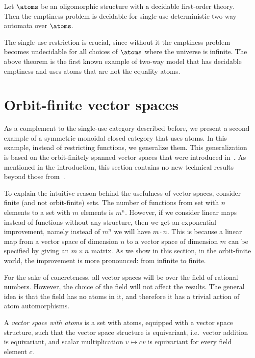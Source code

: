 \begin{theorem}\label{thm:two-way-automata}
    Let $\atoms$ be an oligomorphic structure with a decidable first-order theory. Then the emptiness problem is decidable for single-use deterministic  two-way automata over $\atoms$.
\end{theorem}

The single-use restriction is crucial, since without it the emptiness problem becomes undecidable for all choices of $\atoms$ where the universe is infinite. The above theorem is the first known example of two-way model that has decidable emptiness and uses atoms that are not the equality atoms. 

\section{Orbit-finite vector spaces}
As a complement to the single-use category described before, we present a second example of a symmetric monoidal closed category that  uses atoms. In this example, instead of restricting functions, we generalize them. This generalization is based on the  orbit-finitely spanned vector spaces that were introduced in~\cite{bojanczykKM21OrbitFiniteVector}. As mentioned in the introduction,  this section contains no new technical results beyond those from~\cite{bojanczykKM21OrbitFiniteVector}. 

To explain the intuitive reason behind the usefulness of vector spaces, consider finite (and not orbit-finite) sets. The number of functions from set with $n$ elements to a set with $m$ elements is $m^n$. However, if we consider linear maps instead of functions without any structure, then we get an exponential improvement, namely instead of $m^n$ we will have $m \cdot n$. 
This is because a linear map from a vector space of dimension $n$ to a vector space of dimension $m$ can be specified by giving an $m \times n$ matrix. As we show in this section,  in the orbit-finite world, the improvement is more pronounced: from infinite to finite.

For the sake of concreteness, all  vector spaces will be over the field of rational numbers. However, the choice of the field will not affect the results. The general idea is that the field has no atoms in it, and therefore it has a trivial action of atom automorphisms. 
\begin{definition}
    A \emph{vector space with atoms} is a set with atoms, equipped with a vector space structure, such that the vector space structure is equivariant, i.e.~vector addition is equivariant, and  scalar multiplication $v \mapsto cv$ is equivariant for every field element $c$.
\end{definition}


